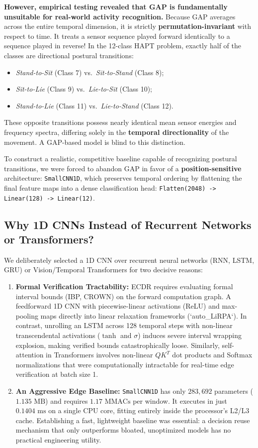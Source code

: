 \documentclass[journal,onecolumn,10pt]{IEEEtran}
\newcommand{\code}[1]{{\small\ttfamily\nolinkurl{#1}}}
\theoremstyle{remark}
\begin{document}
\textbf{However, empirical testing revealed that GAP is fundamentally unsuitable for real-world activity recognition.} Because GAP averages across the entire temporal dimension, it is strictly \textbf{permutation-invariant} with respect to time. It treats a sensor sequence played forward identically to a sequence played in reverse! 
In the 12-class HAPT problem, exactly half of the classes are directional postural transitions:
\begin{itemize}[leftmargin=1.4em]
  \item \textit{Stand-to-Sit} (Class 7) vs.\ \textit{Sit-to-Stand} (Class 8);
  \item \textit{Sit-to-Lie} (Class 9) vs.\ \textit{Lie-to-Sit} (Class 10);
  \item \textit{Stand-to-Lie} (Class 11) vs.\ \textit{Lie-to-Stand} (Class 12).
\end{itemize}
These opposite transitions possess nearly identical mean sensor energies and frequency spectra, differing solely in the \textbf{temporal directionality} of the movement. A GAP-based model is blind to this distinction.

To construct a realistic, competitive baseline capable of recognizing postural transitions, we were forced to abandon GAP in favor of a \textbf{position-sensitive} architecture: \code{SmallCNN1D}, which preserves temporal ordering by flattening the final feature maps into a dense classification head: \code{Flatten(2048) -> Linear(128) -> Linear(12)}.

\subsection{Why 1D CNNs Instead of Recurrent Networks or Transformers?}
We deliberately selected a 1D CNN over recurrent neural networks (RNN, LSTM, GRU) or Vision/Temporal Transformers for two decisive reasons:
\begin{enumerate}[leftmargin=1.4em]
  \item \textbf{Formal Verification Tractability:} ECDR requires evaluating formal interval bounds (IBP, CROWN) on the forward computation graph. A feedforward 1D CNN with piecewise-linear activations (ReLU) and max-pooling maps directly into linear relaxation frameworks (`auto_LiRPA`). In contrast, unrolling an LSTM across 128 temporal steps with non-linear transcendental activations ($\tanh$ and $\sigma$) induces severe interval wrapping explosion, making verified bounds catastrophically loose. Similarly, self-attention in Transformers involves non-linear $Q K^T$ dot products and Softmax normalizations that were computationally intractable for real-time edge verification at batch size 1.
  \item \textbf{An Aggressive Edge Baseline:} \code{SmallCNN1D} has only $283,692$ parameters ($1.135\text{ MB}$) and requires $1.17\text{ MMACs}$ per window. It executes in just \textbf{$0.1404\text{ ms}$} on a single CPU core, fitting entirely inside the processor's L2/L3 cache. Establishing a fast, lightweight baseline was essential: a decision reuse mechanism that only outperforms bloated, unoptimized models has no practical engineering utility.
\end{enumerate}
\end{document}
